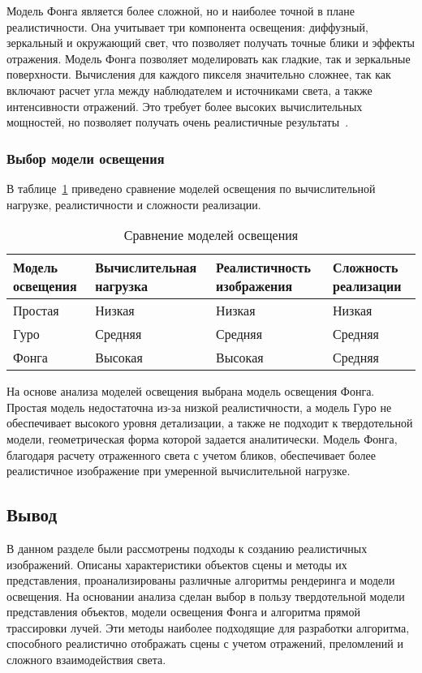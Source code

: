 Модель Фонга является более сложной, но и наиболее точной в плане реалистичности. Она учитывает три компонента освещения: диффузный, зеркальный и окружающий свет, что позволяет получать точные блики и эффекты отражения. Модель Фонга позволяет моделировать как гладкие, так и зеркальные поверхности. Вычисления для каждого пикселя значительно сложнее, так как включают расчет угла между наблюдателем и источниками света, а также интенсивности отражений. Это требует более высоких вычислительных мощностей, но позволяет получать очень реалистичные результаты~\cite[c.~33]{Zadorozhny2020}.

\subsubsection*{Выбор модели освещения}

В таблице~\ref{table:lt} приведено сравнение моделей освещения по вычислительной нагрузке, реалистичности и сложности реализации.

\begin{table}[h!]
	\centering
	\small
	\renewcommand{\arraystretch}{1.5}
	\caption{Сравнение моделей освещения}
	\begin{tabular}{|>{\raggedright\arraybackslash}m{3.8cm}|>{\raggedright\arraybackslash}m{3.8cm}|>{\raggedright\arraybackslash}m{3.8cm}|>{\raggedright\arraybackslash}m{3cm}|}
		\hline
		\textbf{Модель освещения} & \textbf{Вычислительная нагрузка} & \textbf{Реалистичность изображения} & \textbf{Сложность реализации} \\ \hline
		Простая & Низкая & Низкая & Низкая \\ \hline
		Гуро & Средняя & Средняя & Средняя \\ \hline
		Фонга & Высокая & Высокая & Средняя \\ \hline
	\end{tabular}
	\label{table:lt}
\end{table}

 На основе анализа моделей освещения выбрана модель освещения Фонга. Простая модель недостаточна из-за низкой реалистичности, а модель Гуро не обеспечивает высокого уровня детализации, а также не подходит к твердотельной модели, геометрическая форма которой задается аналитически. Модель Фонга, благодаря расчету отраженного света с учетом бликов, обеспечивает более реалистичное изображение при умеренной вычислительной нагрузке.

\subsection*{Вывод}

В данном разделе были рассмотрены подходы к созданию реалистичных изображений. Описаны характеристики объектов сцены и методы их представления, проанализированы различные алгоритмы рендеринга и модели освещения. На основании анализа сделан выбор в пользу твердотельной модели представления объектов, модели освещения Фонга и алгоритма прямой трассировки лучей. Эти методы наиболее подходящие для разработки алгоритма, способного реалистично отображать сцены с учетом отражений, преломлений и сложного взаимодействия света.